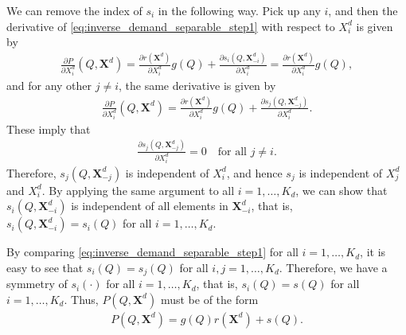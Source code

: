 \documentclass[11pt, a4paper]{article}
\begin{document}
We can remove the index of $s_i$ in the following way.
Pick up any $i$, and then the derivative of \eqref{eq:inverse_demand_separable_step1} with respect to $X^{d}_i$ is given by
\begin{align}
    \frac{\partial P}{\partial X^{d}_i}(Q, \bm{X}^{d}) = \frac{\partial r(\bm{X}^{d})}{\partial X^{d}_i} g(Q) + \frac{\partial s_i(Q, \bm{X}^{d}_{-i})}{\partial X^{d}_i} = \frac{\partial r(\bm{X}^{d})}{\partial X^{d}_i} g(Q),
\end{align}
and for any other $j \ne i$, the same derivative is given by
\begin{align}
    \frac{\partial P}{\partial X^{d}_i}(Q, \bm{X}^{d}) = \frac{\partial r(\bm{X}^{d})}{\partial X^{d}_i} g(Q) + \frac{\partial s_j(Q, \bm{X}^{d}_{-j})}{\partial X^{d}_i}.
\end{align}
These imply that
\begin{align}
    \frac{\partial s_j(Q, \bm{X}^{d}_{-j})}{\partial X^{d}_i} = 0 \quad \text{for all } j \ne i.
\end{align}
Therefore, $s_j(Q, \bm{X}^{d}_{-j})$ is independent of $X^{d}_i$, and hence $s_j$ is independent of $X^{d}_j$ and $X^{d}_i$.
By applying the same argument to all $i = 1, \ldots, K_d$, we can show that $s_i(Q, \bm{X}^{d}_{-i})$ is independent of all elements in $\bm{X}^{d}_{-i}$, that is, $s_i(Q, \bm{X}^{d}_{-i}) = s_i(Q)$ for all $i = 1, \ldots, K_d$.

By comparing \eqref{eq:inverse_demand_separable_step1} for all $i = 1, \ldots, K_d$, it is easy to see that $s_i(Q) = s_j(Q)$ for all $i,j = 1, \ldots, K_d$.
Therefore, we have a symmetry of $s_i(\cdot)$ for all $i = 1, \ldots, K_d$, that is, $s_i(Q) = s(Q)$ for all $i = 1, \ldots, K_d$.
Thus, $P(Q, \bm{X}^{d})$ must be of the form
\begin{align}
    P(Q, \bm{X}^{d}) = g(Q)r(\bm{X}^{d}) + s(Q). \label{eq:inverse_demand_separable_c_i_constant}
\end{align}
\end{document}
